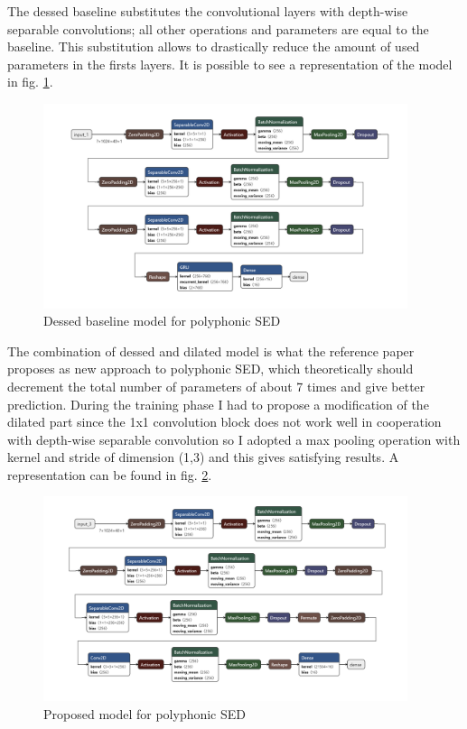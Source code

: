 \documentclass{article}
\begin{document}
The dessed baseline substitutes the convolutional layers with depth-wise separable convolutions; all other operations and parameters are equal to the baseline. This substitution allows to drastically reduce the amount of used parameters in the firsts layers. It is possible to see a representation of the model in fig. \ref{fig:poly_dessed}.

\begin{figure}[H]
	\centering
	\includegraphics[width=0.95\textwidth]{./images/poly/dessed.png}	
	\caption{Dessed baseline model for polyphonic SED}
	\label{fig:poly_dessed}
\end{figure}

The combination of dessed and dilated model is what the reference paper \cite{drossos2020sound} proposes as new approach to polyphonic SED, which theoretically should decrement the total number of parameters of about 7 times and give better prediction. During the training phase I had to propose a modification of the dilated part since the 1x1 convolution block does not work well in cooperation with depth-wise separable convolution so I adopted a max pooling operation with kernel and stride of dimension (1,3) and this gives satisfying results. A representation can be found in fig. \ref{fig:poly_new_model}.

\begin{figure}[h]
	\centering
	\includegraphics[width=0.95\textwidth]{./images/poly/new model.png}	
	\caption{Proposed model for polyphonic SED}
	\label{fig:poly_new_model}
\end{figure}
\end{document}
